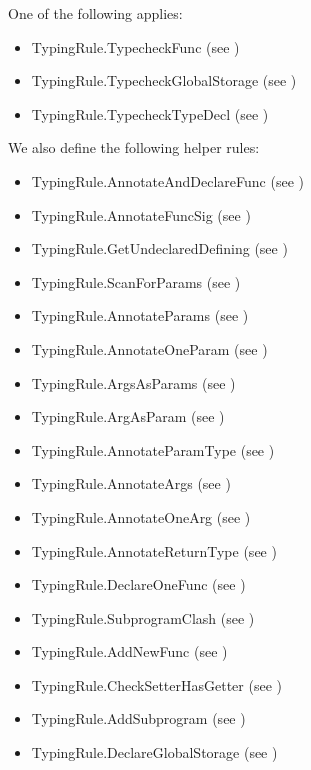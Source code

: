 \documentclass{book}
\begin{document}
One of the following applies:
\begin{itemize}
  \item TypingRule.TypecheckFunc (see )
  \item TypingRule.TypecheckGlobalStorage (see )
  \item TypingRule.TypecheckTypeDecl (see )
\end{itemize}
We also define the following helper rules:
\begin{itemize}
  \item TypingRule.AnnotateAndDeclareFunc (see )
  \item TypingRule.AnnotateFuncSig (see )
  \item TypingRule.GetUndeclaredDefining (see )
  \item TypingRule.ScanForParams (see )
  \item TypingRule.AnnotateParams (see )
  \item TypingRule.AnnotateOneParam (see )
  \item TypingRule.ArgsAsParams (see )
  \item TypingRule.ArgAsParam (see )
  \item TypingRule.AnnotateParamType (see )
  \item TypingRule.AnnotateArgs (see )
  \item TypingRule.AnnotateOneArg (see )
  \item TypingRule.AnnotateReturnType (see )
  \item TypingRule.DeclareOneFunc (see )
  \item TypingRule.SubprogramClash (see )
  \item TypingRule.AddNewFunc (see )
  \item TypingRule.CheckSetterHasGetter (see )
  \item TypingRule.AddSubprogram (see )
  \item TypingRule.DeclareGlobalStorage (see )

\end{itemize}
\end{document}
